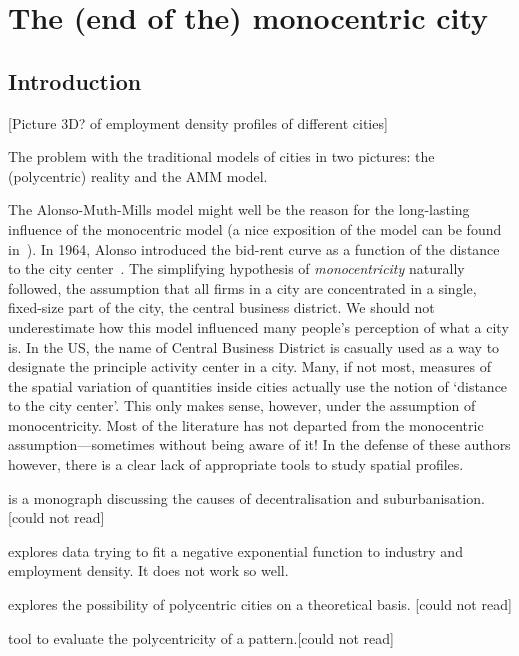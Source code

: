 %
\chapter{The (end of the) monocentric city}
\label{sec:related}


\section{Introduction}
\label{sec:introduction}

[Picture 3D? of employment density profiles of different cities]

The problem with the traditional models of cities in two pictures: the
(polycentric) reality and the AMM model.


The Alonso-Muth-Mills model might well be the reason for the long-lasting influence of
the monocentric model (a nice exposition of the model can be found
in~\cite{Fujita:1989}). In 1964, Alonso introduced the bid-rent curve as a
function of the distance to the city center~\cite{Alonso:1964}. The simplifying hypothesis of
\emph{monocentricity} naturally followed, the assumption that all firms in a
city are concentrated in a single, fixed-size part of the city, the central business
district. We should not underestimate how this model influenced many people's
perception of what a city is. In the US, the name of Central Business District
is casually used as a way to designate the principle activity center in a city.
Many, if not most, measures of the spatial variation of quantities inside cities
actually use the notion of `distance to the city center'. This only makes sense,
however, under the assumption of monocentricity. Most of the
literature has not departed from the monocentric assumption---sometimes without
being aware of it! In the defense of these authors however, there is a clear
lack of appropriate tools to study spatial profiles.


\cite{Mills:1972} is a monograph discussing the causes of decentralisation and
suburbanisation. [could not read]

\cite{Kemper:1974} explores data trying to fit a negative exponential function
to industry and employment density. It does not work so well.

\cite{Odland:1978} explores the possibility of polycentric cities on a
theoretical basis. [could not read]

\cite{Griffith:1981} tool to evaluate the polycentricity of a pattern.[could not
read]

